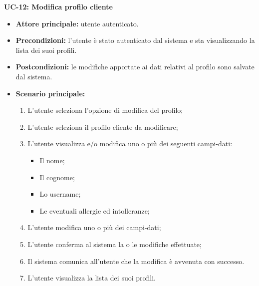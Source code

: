\textbf{UC-12: Modifica profilo cliente}
\begin{itemize}
\item \textbf{Attore principale:} utente autenticato.
\item \textbf{Precondizioni:} l'utente è stato autenticato dal sistema e sta visualizzando la lista dei suoi profili.
\item \textbf{Postcondizioni:} le modifiche apportate ai dati relativi al profilo sono salvate dal sistema.
\item \textbf{Scenario principale:}
\begin{enumerate}
    \item L'utente seleziona l'opzione di modifica del profilo;
    \item L'utente seleziona il profilo cliente da modificare;
    \item L'utente visualizza e/o modifica uno o più dei seguenti campi-dati:
        \begin{itemize}
            \item Il nome;
            \item Il cognome;
            \item Lo username;
            \item Le eventuali allergie ed intolleranze;
        \end{itemize}
    \item L'utente modifica uno o più dei campi-dati;
    \item L'utente conferma al sistema la o le modifiche effettuate;
    \item Il sistema comunica all'utente che la modifica è avvenuta con successo.
    \item L'utente visualizza la lista dei suoi profili.
\end{enumerate}
\end{itemize}

